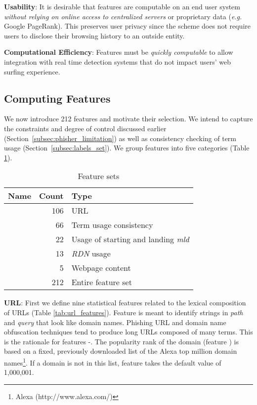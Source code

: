 \documentclass[10pt,conference,compsocconf,letterpaper]{IEEEtran}
\begin{document}
\noindent\textbf{Usability}: It is desirable that features are computable on an end user system \emph{without relying on online access to centralized servers} or proprietary data (\textit{e.g.} Google PageRank). This preserves user privacy since the scheme does not require users to disclose their browsing history to an outside entity. 



\noindent\textbf{Computational Efficiency}: Features must be \emph{quickly computable} to allow integration with real time detection systems that do not impact users' web surfing experience.

\subsection{Computing Features}
\label{subsec:feat_comp}

We now introduce 212 features and motivate their selection. 
We intend to capture the constraints and degree of control discussed earlier (Section~\ref{subsec:phisher_limitation}) as well as consistency checking of term usage (Section~\ref{subsec:labels_set}).
We group features into five categories (Table \ref{tab:feature_type}).

\begin{table}[tbh]
\caption{Feature sets} \centering
\begin{tabular}{r r l}

\textbf{Name} & \textbf{Count}  & \textbf{Type}\\ \hline
 & 106 & URL \\
 &66 & Term usage consistency \\
 &22 & Usage of starting and landing \textit{mld} \\
 &13 & \textit{RDN} usage \\
 &5 & Webpage content \\ \hline
 & 212 & Entire feature set

\end{tabular}
\label{tab:feature_type}
\end{table}

\noindent\textbf{URL}: 
First we  define nine statistical features related to the lexical composition of URLs (Table \ref{tab:url_features}). Feature  is meant to identify strings in \emph{path} and \emph{query} that look like domain names. Phishing URL and domain name obfuscation techniques \cite{le:2011:phishdef} tend to produce long URLs composed of many terms. This is the rationale for features -. The popularity rank of the domain (feature ) is based on a fixed, previously downloaded list of the Alexa top million domain names\footnote{Alexa (http://www.alexa.com/)}. If a domain is not in this list, feature  takes the default value of 1,000,001.
\end{document}
